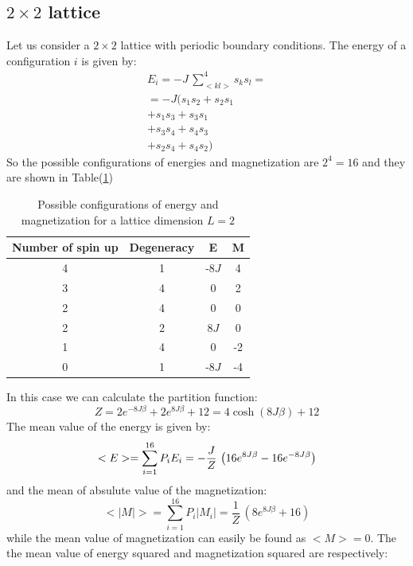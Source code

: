 \documentclass[%
preprint,
 amsmath,amssymb,
 aps,
]{revtex4-1}
\theoremstyle{plain}
\theoremstyle{definition}
\theoremstyle{plain}
\begin{document}
\subsection{$2\times 2$ lattice}
Let us consider a $2 \times 2$ lattice with periodic boundary conditions.
The energy of a configuration $i$ is given by:
\begin{equation}
\begin{split}
E_i = - J \, \sum _{<kl>} ^4 s_k s_l =\\
= - J ( s_1 s_2 + s_2 s_1 \\
 + s_1 s_3 + s_3 s_1 \\
 + s_3 s_4 + s_4 s_3 \\
 + s_2 s_4 + s_4 s_2 )
\end{split}
\end{equation}
So the possible configurations of energies and magnetization are $2^4 = 16$ and they are shown in Table(\ref{configurations})
\begin{table}
\centering
\setlength{\tabcolsep}{12pt}
\caption{Possible configurations of energy and magnetization for a lattice dimension $L=2$}
\label{configurations}
\begin{tabular}{cccc}
\toprule
Number of spin up & Degeneracy  & E & M \\
\midrule
4 & 1 & -8$J$  & 4 \\
3 & 4 &	 0 & 2 \\
2 & 4 & 0  & 0 \\
2 & 2 &  8$J$ & 0 \\
1 & 4 &  0 & -2   \\
0 & 1 & -8$J$ & -4 \\
\bottomrule
\end{tabular}

\end{table}
In this case we can calculate the partition function:
\[
Z = 2e^{-8J\beta} + 2e^{8J\beta} + 12 = 4 \cosh(8J\beta) + 12
\]
The mean value of the energy is given by:
\begin{equation} \notag
<E> = \sum _{i=1} ^{16} P_i E_i = - \frac{J}{Z} \, \left( 16 e^{8J\beta} - 16e^{-8J\beta} \right)
\end{equation}
and the mean of absulute value of the magnetization:
\begin{equation}
<|M|> = \sum _{i=1} ^{16} P_i |M_i| = \frac{1}{Z} \, \left( 8 e^{8J\beta} + 16 \right)
\end{equation}
while the mean value of magnetization can easily be found as $<M> = 0$. 
The the mean value of energy squared and magnetization squared are respectively:
\end{document}
